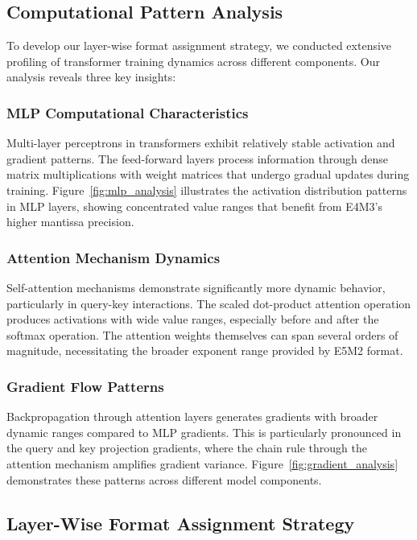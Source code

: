 \documentclass[conference]{IEEEtran}
\begin{document}
\subsection{Computational Pattern Analysis}

To develop our layer-wise format assignment strategy, we conducted extensive profiling of transformer training dynamics across different components. Our analysis reveals three key insights:

\subsubsection{MLP Computational Characteristics}
Multi-layer perceptrons in transformers exhibit relatively stable activation and gradient patterns. The feed-forward layers process information through dense matrix multiplications with weight matrices that undergo gradual updates during training. Figure~\ref{fig:mlp_analysis} illustrates the activation distribution patterns in MLP layers, showing concentrated value ranges that benefit from E4M3's higher mantissa precision.

\subsubsection{Attention Mechanism Dynamics}
Self-attention mechanisms demonstrate significantly more dynamic behavior, particularly in query-key interactions. The scaled dot-product attention operation produces activations with wide value ranges, especially before and after the softmax operation. The attention weights themselves can span several orders of magnitude, necessitating the broader exponent range provided by E5M2 format.

\subsubsection{Gradient Flow Patterns}
Backpropagation through attention layers generates gradients with broader dynamic ranges compared to MLP gradients. This is particularly pronounced in the query and key projection gradients, where the chain rule through the attention mechanism amplifies gradient variance. Figure~\ref{fig:gradient_analysis} demonstrates these patterns across different model components.

\subsection{Layer-Wise Format Assignment Strategy}
\end{document}
